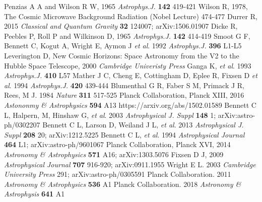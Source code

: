 \documentclass[twocolumn, prl, nobalancelastpage, aps, citeautoscript, longbibliography, 10pt]{revtex4-1}
\begin{document}
\begin{thebibliography}{99}
     Penzias A A and Wilson R W, 1965 \textit{Astrophys.J.} \textbf{142} 419-421
     Wilson R, 1978, The Cosmic Microwave Background Radiation (Nobel Lecture) 474-477
     Durrer R, 2015 \textit{Classical and Quantum Gravity} \textbf{32} 124007; arXiv:1506.01907
     Dicke R, Peebles P, Roll P and Wilkinson D, 1965 \textit{Astrophys.J.} \textbf{142} 414-419
     Smoot G F, Bennett C, Kogut A, Wright E, Aymon J \textit{et al}. 1992 \textit{Astrophys.J.} \textbf{396} L1-L5
     Leverington D, New Cosmic Horizons: Space Astronomy from the V2 to the Hubble Space Telescope, 2000 
    \textit{Cambridge Univeristy Press}
     Ganga K, \textit{et al}. 1993 \textit{Astrophys.J.} \textbf{410} L57
     Mather J C, Cheng E, Cottingham D, Eplee R, Fixsen D \textit{et al}. 1994 \textit{Astrophys.J.} \textbf{420}
    439-444
     Blumenthal G R, Faber S M, Primack J R, Rees, M J. 1984 \textit{Nature} \textbf{311} 517-525
     Planck Collaboration, Planck XIII,  2016 \textit{Astononmy \& Astrophysics} \textbf{594} A13 https://arxiv.org/abs/1502.01589
     Bennett C L, Halpern, M, Hinshaw G, \textit{et al}. 2003 \textit{Astrophysical J. Suppl} \textbf{148} 1; arXiv:astro-ph/0302207
     Bennett C L, Larson D, Weiland J L, \textit{et al}. 2013 \textit{Astrophysical J. Suppl} \textbf{208} 20; arXiv:1212.5225
     Bennett C L, \textit{et al}. 1994 \textit{Astrophysical Journal} \textbf{464} L1; arXiv:astro-ph/9601067
     Planck Collaboration, Planck XVI, 2014 \textit{Astronomy \& Astrophysics} \textbf{571} A16; arXiv:1303.5076
     Fixsen D J, 2009 \textit{Astrophysical Journal} \textbf{707} 916-920; arXiv:0911.1955 
     Wright E L. 2003 \textit{Cambridge University Press} 291; arXiv:astro-ph/0305591
     Planck Collaboration. 2011 \textit{Astronomy \& Astrophysics} \textbf{536} A1
     Planck Collaboration. 2018 \textit{Astronomy \& Astrophysis} \textbf{641} A1

    

\end{thebibliography}
\end{document}
